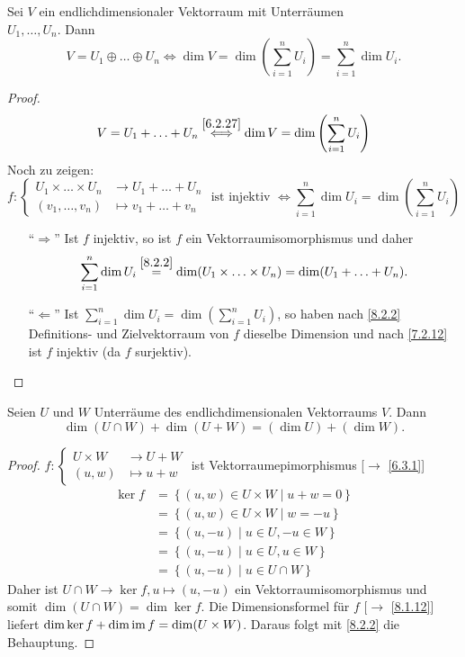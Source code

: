 \documentclass[../../main.tex]{subfiles}
\begin{document}
\begin{pro}\label{8.2.4}
Sei $V$ ein endlichdimensionaler Vektorraum mit Unterräumen \\
$U_1,\ldots,U_n$. Dann \[V = U_1\oplus \ldots\oplus U_n\iff \dim V = \dim \left(\sum_{i = 1}^{n}U_i\right) = \sum_{i = 1}^{n}\dim U_i.\]
\end{pro}
\begin{proof}
$$V = U_1+\ldots+U_n\overset{\ref{6.2.27}}{\iff} \dim V = \dim \left(\sum_{i = 1}^{n} U_i\right)$$
Noch zu zeigen:
$$f : \begin{cases}
U_1\times \ldots\times U_n & \to U_1+\ldots+U_n\\
(v_1,\ldots,v_n) &\mapsto v_1+\ldots+v_n 
\end{cases}\text{ ist injektiv }\iff \sum_{i = 1}^{n}\dim U_i = \dim \left(\sum_{i = 1}^{n}U_i\right)$$
\begin{itemize}
\item["`$\Longrightarrow$"'] Ist $f$ injektiv, so ist $f$ ein Vektorraumisomorphismus und daher
\[\sum_{i = 1}^{n}\dim U_i \overset{\ref{8.2.2}}{=} \dim(U_1\times \ldots\times U_n) = \dim (U_1 +\ldots+U_n).\]
\item["`$\Longleftarrow$"'] Ist $\sum_{i = 1}^{n}\dim U_i = \dim \left(\sum_{i = 1}^{n}U_i\right)$, so haben nach \ref{8.2.2} Definitions- und Zielvektorraum von $f$ dieselbe Dimension und nach \ref{7.2.12} ist $f$ injektiv (da $f$ surjektiv).
\end{itemize}
\end{proof}

\begin{sat}\label{8.2.5}
Seien $U$ und $W$ Unterräume des endlichdimensionalen Vektorraums $V$. Dann \[\dim (U\cap W) + \dim (U+W) = (\dim U) +(\dim W).\]
\end{sat}
\begin{proof}
$f\colon\begin{cases}
U\times W & \to U+W\\
(u,w) &\mapsto u+w
\end{cases}$ ist Vektorraumepimorphismus [$\to$ \ref{6.3.1}]
\begin{align*}
\ker f & = \left\{(u,w)\in U\times W\mid u+w = 0\right\}\\
& = \left\{(u,w)\in U\times W\mid w = -u\right\}\\
& = \left\{(u,-u)\mid u\in U, -u\in W\right\}\\
& = \left\{(u,-u)\mid u\in U, u\in W\right\}\\
& = \left\{(u,-u)\mid u\in U\cap W\right\}
\end{align*}
Daher ist $U\cap W\to \ker f, u\mapsto (u,-u)$ ein Vektorraumisomorphismus und somit $\dim (U\cap W) = \dim \ker f$. Die Dimensionsformel für $f$ [$\to$ \ref{8.1.12}] liefert $\dim \ker f +\dim \operatorname{im} f = \dim (U\times W)$. Daraus folgt mit \ref{8.2.2} die Behauptung.
\end{proof}
\end{document}
